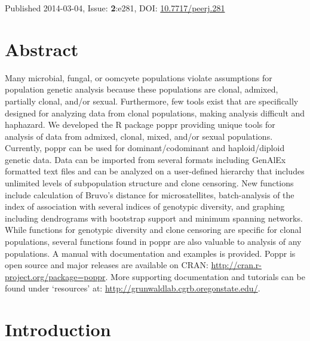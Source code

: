\documentclass[double,12pt]{beavtex}
\begin{document}
  Published 2014-03-04, Issue: \textbf{2}:e281, DOI:
  \href{https://dx.doi.org/10.7717/peerj.281}{10.7717/peerj.281}
  
  \doublespacing
  \newpage
  
  \section{Abstract}\label{abstract}
  
  Many microbial, fungal, or oomcyete populations violate assumptions for
  population genetic analysis because these populations are clonal,
  admixed, partially clonal, and/or sexual. Furthermore, few tools exist
  that are specifically designed for analyzing data from clonal
  populations, making analysis difficult and haphazard. We developed the R
  package poppr providing unique tools for analysis of data from admixed,
  clonal, mixed, and/or sexual populations. Currently, poppr can be used
  for dominant/codominant and haploid/diploid genetic data. Data can be
  imported from several formats including GenAlEx formatted text files and
  can be analyzed on a user-defined hierarchy that includes unlimited
  levels of subpopulation structure and clone censoring. New functions
  include calculation of Bruvo's distance for microsatellites,
  batch-analysis of the index of association with several indices of
  genotypic diversity, and graphing including dendrograms with bootstrap
  support and minimum spanning networks. While functions for genotypic
  diversity and clone censoring are specific for clonal populations,
  several functions found in poppr are also valuable to analysis of any
  populations. A manual with documentation and examples is provided. Poppr
  is open source and major releases are available on CRAN:
  \url{http://cran.r-project.org/package=poppr}. More supporting
  documentation and tutorials can be found under `resources' at:
  \url{http://grunwaldlab.cgrb.oregonstate.edu/}.
  
  \section{Introduction}\label{introduction-1}
  
\end{document}

